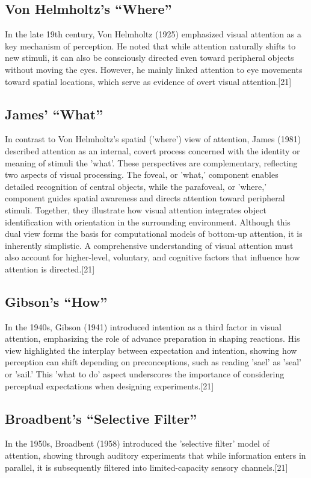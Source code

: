\documentclass[12pt]{report}
\begin{document}
\subsection{Von Helmholtz's “Where”}
In the late 19th century, Von Helmholtz (1925) emphasized visual attention as a key mechanism of perception.
He noted that while attention naturally shifts to new stimuli, it can also be consciously directed even toward peripheral objects without moving the eyes. 
However, he mainly linked attention to eye movements toward spatial locations, which serve as evidence of overt visual attention.[21]

\subsection{James' “What”}
In contrast to Von Helmholtz's spatial ('where') view of attention, James (1981) described attention as an internal, covert process concerned with the identity or meaning of stimuli the 'what'. 
These perspectives are complementary, reflecting two aspects of visual processing.
The foveal, or 'what,' component enables detailed recognition of central objects, while the parafoveal, or 'where,' component guides spatial awareness and directs attention toward peripheral stimuli. 
Together, they illustrate how visual attention integrates object identification with orientation in the surrounding environment.
Although this dual view forms the basis for computational models of bottom-up attention, it is inherently simplistic. 
A comprehensive understanding of visual attention must also account for higher-level, voluntary, and cognitive factors that influence how attention is directed.[21]

\subsection{Gibson's “How”}
In the 1940s, Gibson (1941) introduced intention as a third factor in visual attention, emphasizing the role of advance preparation in shaping reactions.
His view highlighted the interplay between expectation and intention, showing how perception can shift depending on preconceptions, such as reading 'sael' as 'seal' or 'sail.'
This 'what to do' aspect underscores the importance of considering perceptual expectations when designing experiments.[21]

\subsection{Broadbent's “Selective Filter”}
In the 1950s, Broadbent (1958) introduced the 'selective filter' model of attention, showing through auditory experiments that while information enters in parallel, it is subsequently filtered into limited-capacity sensory channels.[21]
\end{document}
